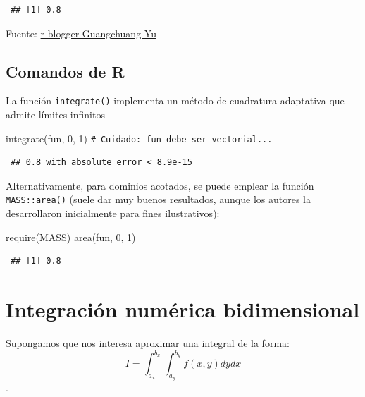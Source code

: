 \documentclass[
  10pt,
]{book}
\newenvironment{Shaded}{\begin{snugshade}}{\end{snugshade}}
\newcommand{\CommentTok}[1]{\textcolor[rgb]{0.56,0.35,0.01}{\textit{#1}}}
\newcommand{\DecValTok}[1]{\textcolor[rgb]{0.00,0.00,0.81}{#1}}
\newcommand{\FunctionTok}[1]{\textcolor[rgb]{0.00,0.00,0.00}{#1}}
\newcommand{\NormalTok}[1]{#1}
\theoremstyle{break}
\theoremstyle{nonumberplain}
\renewcommand{\CommentTok}[1]{\textcolor[rgb]{0.41,0.41,0.41}{\texttt{#1}}}
\begin{document}
\begin{verbatim}
 ## [1] 0.8
\end{verbatim}

Fuente: \href{https://www.r-bloggers.com/one-dimensional-integrals}{r-blogger Guangchuang Yu}

\hypertarget{comandos-de-r}{%
\subsection{Comandos de R}\label{comandos-de-r}}

La función \texttt{integrate()} implementa un método de cuadratura adaptativa que admite límites infinitos

\begin{Shaded}
\begin{Highlighting}[]
\FunctionTok{integrate}\NormalTok{(fun, }\DecValTok{0}\NormalTok{, }\DecValTok{1}\NormalTok{)  }\CommentTok{\# Cuidado: fun debe ser vectorial...}
\end{Highlighting}
\end{Shaded}

\begin{verbatim}
 ## 0.8 with absolute error < 8.9e-15
\end{verbatim}

Alternativamente, para dominios acotados, se puede emplear la función \texttt{MASS::area()} (suele dar muy buenos resultados, aunque los autores la desarrollaron inicialmente para fines ilustrativos):

\begin{Shaded}
\begin{Highlighting}[]
\FunctionTok{require}\NormalTok{(MASS)}
\FunctionTok{area}\NormalTok{(fun, }\DecValTok{0}\NormalTok{, }\DecValTok{1}\NormalTok{)}
\end{Highlighting}
\end{Shaded}

\begin{verbatim}
 ## [1] 0.8
\end{verbatim}

\hypertarget{integraciuxf3n-numuxe9rica-bidimensional}{%
\section{Integración numérica bidimensional}\label{integraciuxf3n-numuxe9rica-bidimensional}}

Supongamos que nos interesa aproximar una integral de la forma:
\[I=\int_{a_x}^{b_x}\int_{a_y}^{b_y}f(x, y)dy dx\].
\end{document}
